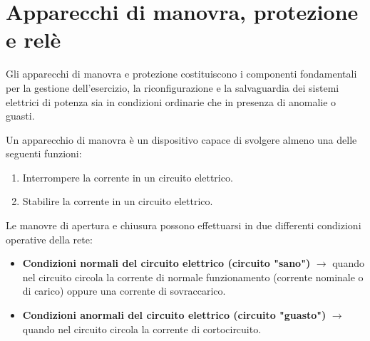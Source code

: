 \chapter{Apparecchi di manovra, protezione e relè}
Gli apparecchi di manovra e protezione costituiscono i componenti fondamentali per la gestione dell'esercizio, la riconfigurazione e la salvaguardia dei sistemi elettrici di potenza sia in condizioni ordinarie che in presenza di anomalie o guasti.

Un apparecchio di manovra è un dispositivo capace di svolgere almeno una delle seguenti funzioni:
\begin{enumerate}
    \item Interrompere la corrente in un circuito elettrico.
    \item Stabilire la corrente in un circuito elettrico.
\end{enumerate}

Le manovre di apertura e chiusura possono effettuarsi in due differenti condizioni operative della rete:
\begin{itemize}
    \item \textbf{Condizioni normali del circuito elettrico (circuito "sano")} $\rightarrow$ quando nel circuito circola la corrente di normale funzionamento (corrente nominale o di carico) oppure una corrente di sovraccarico.
    \item \textbf{Condizioni anormali del circuito elettrico (circuito "guasto")} $\rightarrow$ quando nel circuito circola la corrente di cortocircuito.
\end{itemize}

